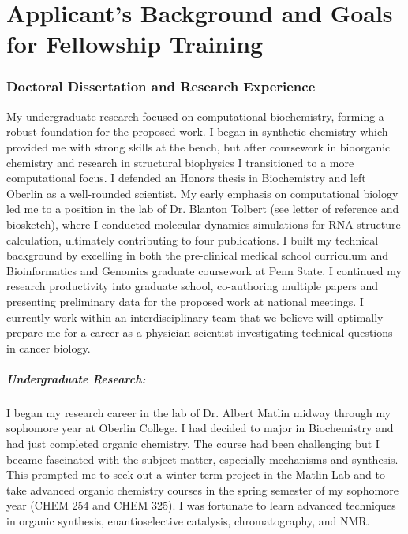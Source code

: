 \documentclass{NIHGrant}
\begin{document}
\part*{Applicant's Background and Goals for Fellowship Training}
\section*{Doctoral Dissertation and Research Experience}
My undergraduate research focused on computational biochemistry, forming a robust foundation for the proposed work. I began in synthetic chemistry which provided me with strong skills at the bench, but after coursework in bioorganic chemistry and research in structural biophysics I transitioned to a more computational focus. I defended an Honors thesis in Biochemistry and left Oberlin as a well-rounded scientist. My early emphasis on computational biology led me to a position in the lab of Dr. Blanton Tolbert (see letter of reference and biosketch), where I conducted molecular dynamics simulations for RNA structure calculation, ultimately contributing to four publications. I built my technical background by excelling in both the pre-clinical medical school curriculum and Bioinformatics and Genomics graduate coursework at Penn State. I continued my research productivity into graduate school, co-authoring multiple papers and presenting preliminary data for the proposed work at national meetings. I currently work within an interdisciplinary team that we believe will optimally prepare me for a career as a physician-scientist investigating technical questions in cancer biology.

\subsubsection*{Undergraduate Research:}
I began my research career in the lab of Dr. Albert Matlin midway through my sophomore year at Oberlin College. I had decided to major in Biochemistry and had just completed organic chemistry. The course had been challenging but I became fascinated with the subject matter, especially mechanisms and synthesis. This prompted me to seek out a winter term project in the Matlin Lab and to take advanced organic chemistry courses in the spring semester of my sophomore year (CHEM 254 and CHEM 325). I was fortunate to learn advanced techniques in organic synthesis, enantioselective catalysis, chromatography, and NMR.
\end{document}
